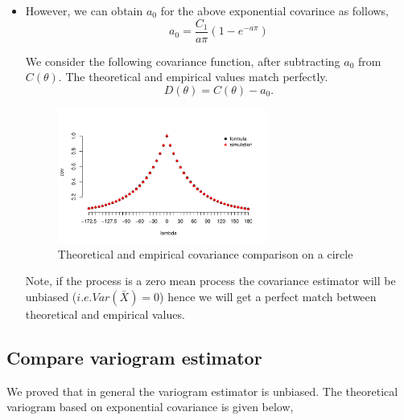 \begin{itemize}
	      
	\item However, we can obtain $a_0$ for the above exponential covarince as follows,
	      \[
	      	a_0 = \frac{C_1}{a\pi}(1 - e^{-a\pi})
	      \]
	      
	      We consider the following covariance function, after subtracting $a_0$ from $C(\theta)$. The theoretical and empirical values match perfectly.
	      \[
	      	D(\theta) = C(\theta) - a_0.
	      \]
	      
	      
	      \begin{figure}[H]
	      	\centering
	      	\includegraphics[width=0.65\textwidth]{graphs/Summary-covarince_circle_2}
	      	\caption {Theoretical and empirical covariance comparison on a circle}
	      \end{figure}
	      
	      Note, if the process is a zero mean process the covariance estimator will be unbiased ($i.e. Var(\bar{X}) = 0$) hence we will get a perfect match between theoretical and empirical values.
	      
\end{itemize}

\subsection{Compare variogram estimator} 

We proved that in general the variogram estimator is unbiased. The theoretical variogram based on exponential covariance is given below,   


